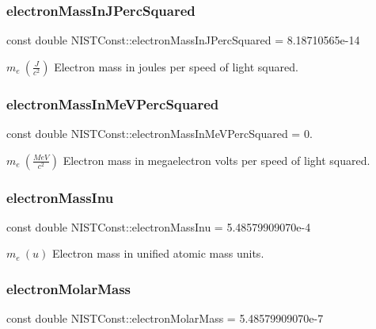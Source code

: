 \subsubsection{\texorpdfstring{electron\+Mass\+In\+J\+Perc\+Squared}{electronMassInJPercSquared}}
{\footnotesize\ttfamily const double N\+I\+S\+T\+Const\+::electron\+Mass\+In\+J\+Perc\+Squared = 8.\+18710565e-\/14}

$m_e \ (\frac{J}{c^2})$ Electron mass in joules per speed of light squared. \mbox{\label{group___n_i_s_t_const-_electron_ga6a41b7cbd78c00ef17e9b17944ab5f5c}} 
\subsubsection{\texorpdfstring{electron\+Mass\+In\+Me\+V\+Perc\+Squared}{electronMassInMeVPercSquared}}
{\footnotesize\ttfamily const double N\+I\+S\+T\+Const\+::electron\+Mass\+In\+Me\+V\+Perc\+Squared = 0.}

$m_e \ (\frac{MeV}{c^2})$ Electron mass in megaelectron volts per speed of light squared. \mbox{\label{group___n_i_s_t_const-_electron_gaa6fc2ab3a81cd61f6d78d64eec8a670d}} 
\subsubsection{\texorpdfstring{electron\+Mass\+Inu}{electronMassInu}}
{\footnotesize\ttfamily const double N\+I\+S\+T\+Const\+::electron\+Mass\+Inu = 5.\+48579909070e-\/4}

$m_e \ (u)$ Electron mass in unified atomic mass units. \mbox{\label{group___n_i_s_t_const-_electron_gaebecd54c70326d72d25d790c0ab62145}} 
\subsubsection{\texorpdfstring{electron\+Molar\+Mass}{electronMolarMass}}
{\footnotesize\ttfamily const double N\+I\+S\+T\+Const\+::electron\+Molar\+Mass = 5.\+48579909070e-\/7}

